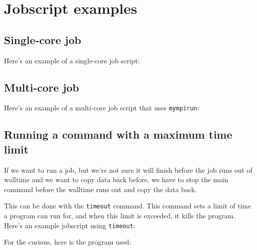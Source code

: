 \chapter{Jobscript examples}
\label{ch:jobscript-examples}

\section{Single-core job}

Here's an example of a single-core job script:


\section{Multi-core job}

Here's an example of a multi-core job script that uses \lstinline|mympirun|:


\section{Running a command with a maximum time limit}
\label{sec:maximum-timelimit-timeout-jobscript}

If we want to run a job, but we're not sure it will finish before the job runs
out of walltime and we want to copy data back before, we have to stop the main
command before the walltime runs out and copy the data back.

This can be done with the \lstinline|timeout| command. This command sets a limit
of time a program can run for, and when this limit is exceeded, it kills the program.
Here's an example jobscript using \lstinline|timeout|:


For the curious, here is the program used:


